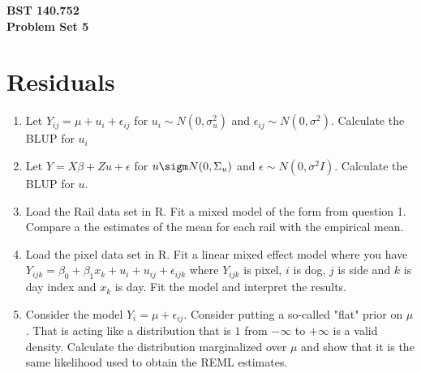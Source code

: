 \documentclass[12pt]{article}
\begin{document}
\noindent
{\bf BST 140.752 \\ Problem Set 5} \\
\section{Residuals}
\begin{enumerate}
\item Let $Y_{ij} = \mu + u_i + \epsilon_{ij}$ for $u_i \sim N(0,\sigma^2_u)$ and $\epsilon_{ij} \sim N(0, \sigma^2)$. Calculate the BLUP 
for $u_i$
\item Let $Y = X \beta + Z u + \epsilon$ for $u \sigm N(0,\Sigma_u)$ and $\epsilon \sim N(0, \sigma^2 I)$. Calculate the BLUP for $u$. 
\item Load the Rail data set in R. Fit a mixed model of the form from question 1. Compare a the estimates of the mean for each rail with the empirical mean.	
\item Load the pixel data set in R. Fit a linear mixed effect model where you have $Y_{ijk} = \beta_0 + \beta_1 x_{k} + u_{i} + u_{ij} + \epsilon_{ijk}$
where $Y_{ijk}$ is pixel, $i$ is dog, $j$ is side and $k$ is day index and $x_k$ is day. Fit the model and interpret the results.
\item Consider the model $Y_{i} = \mu + \epsilon_{ij}$. Consider putting a so-called "flat" prior on $\mu$. That is acting like a distribution
that is $1$ from $-\infty$ to $+\infty$ is a valid density. Calculate the distribution marginalized over $\mu$ and show that it is the same likelihood
used to obtain the REML estimates.
\end{enumerate}
\end{document}
